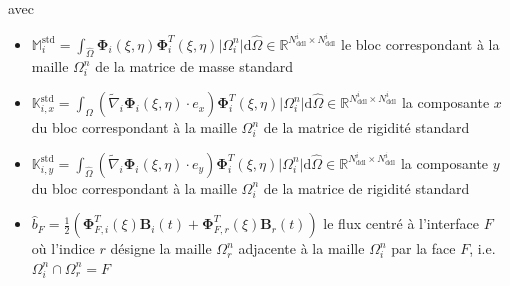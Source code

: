 \documentclass[11pt, a4paper, oneside]{report}
\begin{document}
avec
\begin{itemize}
    \item $\displaystyle \mathbb{M}_i^\text{std} = \int_{\widehat{\Omega}} \bm{\Phi}_i(\xi, \eta) \bm{\Phi}_i^T(\xi, \eta) \lvert \Omega_i^n \rvert \text{d}\widehat{\Omega} \in \mathbb{R}^{N_\text{ddl}^i \times N_\text{ddl}^i}$ le bloc correspondant à la maille $\Omega_i^n$ de la matrice de masse standard
    \item $\displaystyle \mathbb{K}_{i, x}^\text{std} = \int_{\widehat{\Omega}} \left( \widetilde{\nabla}_i \bm{\Phi}_i(\xi, \eta) \cdot e_x \right) \bm{\Phi}_i^T(\xi, \eta) \lvert \Omega_i^n \rvert \text{d}\widehat{\Omega} \in \mathbb{R}^{N_\text{ddl}^i \times N_\text{ddl}^i}$ la composante $x$ du bloc correspondant à la maille $\Omega_i^n$ de la matrice de rigidité standard
    \item $\displaystyle \mathbb{K}_{i, y}^\text{std} = \int_{\widehat{\Omega}} \left( \widetilde{\nabla}_i \bm{\Phi}_i(\xi, \eta) \cdot e_y \right) \bm{\Phi}_i^T(\xi, \eta) \lvert \Omega_i^n \rvert \text{d}\widehat{\Omega} \in \mathbb{R}^{N_\text{ddl}^i \times N_\text{ddl}^i}$ la composante $y$ du bloc correspondant à la maille $\Omega_i^n$ de la matrice de rigidité standard
    \item $\displaystyle \widehat{b}_F = \frac{1}{2} \left( \bm{\Phi}_{F, i}^T(\xi) \bm{B}_i(t) + \bm{\Phi}_{F, r}^T(\xi) \bm{B}_r(t) \right)$ le flux centré à l'interface $F$ où l'indice $r$ désigne la maille $\Omega_r^n$ adjacente à la maille $\Omega_i^n$ par la face $F$, i.e. $\Omega_i^n \cap \Omega_r^n = F$
\end{itemize}
\end{document}
